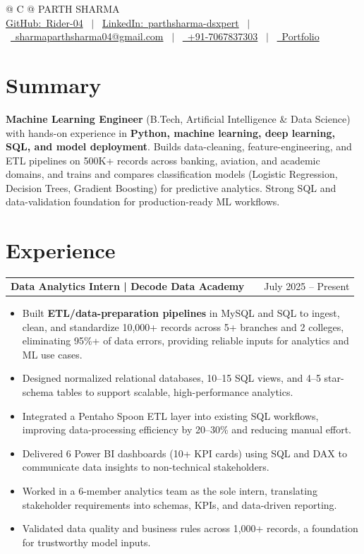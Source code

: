 \documentclass[a4paper,10pt]{article}
\makeatletter
\newcommand{\faGithub}{GitHub:}\newcommand{\faLinkedin}{LinkedIn:}\newcommand{\faEnvelope}{}%
\newcommand{\faMobile}{}\newcommand{\faGlobe}{}}
\newenvironment{joblong}[2]
    {
    \begin{tabularx}{\linewidth}{@{}l X r@{}}
    \textbf{#1} & \hfill &  #2 \\[2pt]
    \end{tabularx}
    \begin{minipage}[t]{\linewidth}
    \begin{itemize}[nosep,after=\strut, leftmargin=1em, itemsep=1pt,label=--]
    }
    {
    \end{itemize}
    \end{minipage}
    }
\makeatother
\begin{document}
\pagestyle{empty}

\begin{tabularx}{\linewidth}{@{} C @{}}
\Huge{PARTH SHARMA} \\[5pt]
\href{https://github.com/Rider-04}{\raisebox{-0.05\height}\faGithub\ Rider-04} \ $|$ \
\href{https://www.linkedin.com/in/parthsharma-dsxpert}{\raisebox{-0.05\height}\faLinkedin\ parthsharma-dsxpert} \ $|$ \
\href{mailto:sharmaparthsharma04@gmail.com}{\raisebox{-0.05\height}\faEnvelope \ sharmaparthsharma04@gmail.com} \ $|$ \
\href{tel:+917067837303}{\raisebox{-0.05\height}\faMobile \ +91-7067837303} \ $|$ \
\href{https://parth-portfolio-virid.vercel.app/}{\raisebox{-0.05\height}\faGlobe \ Portfolio}
\end{tabularx}

\section{Summary}
\textbf{Machine Learning Engineer} (B.Tech, Artificial Intelligence \& Data Science) with hands-on experience in \textbf{Python, machine learning, deep learning, SQL, and model deployment}. Builds data-cleaning, feature-engineering, and ETL pipelines on 500K+ records across banking, aviation, and academic domains, and trains and compares classification models (Logistic Regression, Decision Trees, Gradient Boosting) for predictive analytics. Strong SQL and data-validation foundation for production-ready ML workflows.

\section{Experience}
\begin{joblong}{Data Analytics Intern | Decode Data Academy}{July 2025 -- Present}
\item Built \textbf{ETL/data-preparation pipelines} in MySQL and SQL to ingest, clean, and standardize 10,000+ records across 5+ branches and 2 colleges, eliminating 95\%+ of data errors, providing reliable inputs for analytics and ML use cases.
\item Designed normalized relational databases, 10--15 SQL views, and 4--5 star-schema tables to support scalable, high-performance analytics.
\item Integrated a Pentaho Spoon ETL layer into existing SQL workflows, improving data-processing efficiency by 20--30\% and reducing manual effort.
\item Delivered 6 Power BI dashboards (10+ KPI cards) using SQL and DAX to communicate data insights to non-technical stakeholders.
\item Worked in a 6-member analytics team as the sole intern, translating stakeholder requirements into schemas, KPIs, and data-driven reporting.
\item Validated data quality and business rules across 1,000+ records, a foundation for trustworthy model inputs.
\end{joblong}
\end{document}
